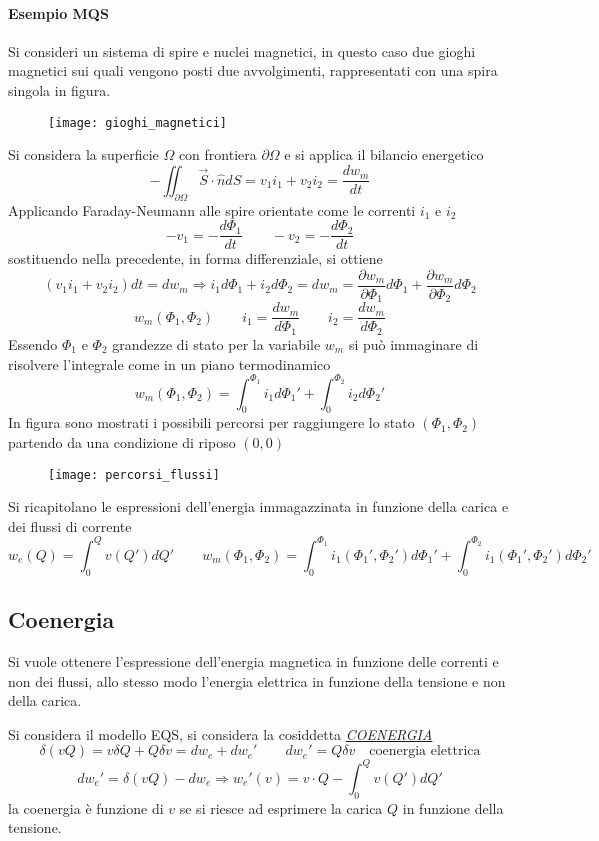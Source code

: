 
\paragraph{Esempio MQS}
Si consideri un sistema di spire e nuclei magnetici, in questo caso due gioghi magnetici sui quali
vengono posti due avvolgimenti, rappresentati con una spira singola in figura.
\begin{figure}[H]
\centering
\texttt{[image: gioghi\_magnetici]}
\end{figure}
Si considera la superficie $\Omega$ con frontiera $\partial \Omega$ e si applica il bilancio energetico
$$
-\iint_{\partial\Omega} \vec{S}\cdot\hat{n}dS = v_1i_1 + v_2i_2 = \frac{dw_m}{dt}
$$
Applicando Faraday-Neumann alle spire orientate come le correnti $i_1$ e $i_2$
$$
-v_1 = -\frac{d\Phi_1}{dt}\qquad -v_2 = -\frac{d\Phi_2}{dt}
$$
sostituendo nella precedente, in forma differenziale, si ottiene
$$
\left(v_1i_1 + v_2i_2\right)dt = dw_m \Rightarrow i_1d\Phi_1 + i_2d\Phi_2 = dw_m = \frac{\partial w_m}{\partial \Phi_1}d\Phi_1 + \frac{\partial w_m}{\partial \Phi_2}d\Phi_2
$$
$$
w_m\left(\Phi_1,\Phi_2\right)\qquad i_1 = \frac{dw_m}{d\Phi_1}\qquad i_2 = \frac{dw_m}{d\Phi_2}
$$
Essendo $\Phi_1$ e $\Phi_2$ grandezze di stato per la variabile $w_m$ si può immaginare di risolvere
l'integrale come in un piano termodinamico
$$
w_m(\Phi_1,\Phi_2) = \int_0^{\Phi_1} i_1d\Phi_1' + \int_0^{\Phi_2} i_2 d\Phi_2'
$$
In figura sono mostrati i possibili percorsi per raggiungere lo stato $(\Phi_1,\Phi_2)$ partendo da una
condizione di riposo $(0,0)$
\begin{figure}[H]
\centering
\texttt{[image: percorsi\_flussi]}
\end{figure}
\newpage
Si ricapitolano le espressioni dell'energia immagazzinata in funzione della carica e dei flussi di corrente
$$
w_e(Q) = \int_0^Q v(Q')dQ'\qquad w_m\left(\Phi_1,\Phi_2\right) = \int_0^{\Phi_1}i_1(\Phi_1',\Phi_2')d\Phi_1' + 
\int_0^{\Phi_2}i_1(\Phi_1',\Phi_2')d\Phi_2'
$$
\subsection{Coenergia}
Si vuole ottenere l'espressione dell'energia magnetica in funzione delle correnti e non dei flussi, allo
stesso modo l'energia elettrica in funzione della tensione e non della carica.

Si considera il modello EQS, si considera la cosiddetta \href{https://en.wikipedia.org/wiki/Coenergy}{\textit{COENERGIA}}
$$
\delta(vQ) = v\delta Q + Q\delta v = dw_e + dw_e'\qquad dw_e' = Q\delta v\quad \text{coenergia elettrica}
$$
$$
dw_e' = \delta(vQ) - dw_e \Rightarrow w_e'(v) = v\cdot Q - \int_0^Q v(Q')dQ'
$$
la coenergia è funzione di $v$ se si riesce ad esprimere la carica $Q$ in funzione della tensione.

